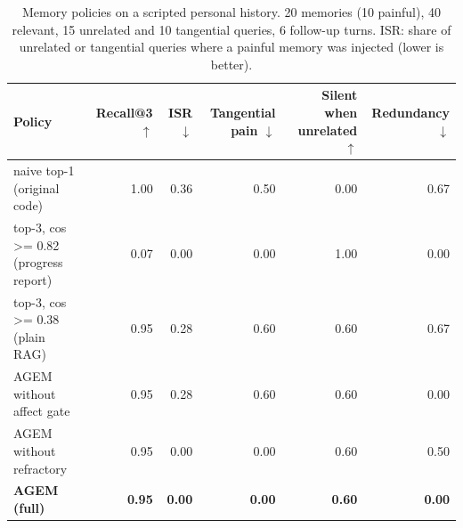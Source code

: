 \begin{table}[t]
\centering
\footnotesize
\caption{Memory policies on a scripted personal history. 20 memories (10 painful), 40 relevant, 15 unrelated and 10 tangential queries, 6 follow-up turns. ISR: share of unrelated or tangential queries where a painful memory was injected (lower is better).}
\label{tab:agem}
\setlength{\tabcolsep}{4pt}
\begin{tabular}{lrrrrr}
\toprule
\textbf{Policy} & \textbf{Recall@3 $\uparrow$} & \textbf{ISR $\downarrow$} & \textbf{Tangential pain $\downarrow$} & \textbf{Silent when unrelated $\uparrow$} & \textbf{Redundancy $\downarrow$} \\
\midrule
naive top-1 (original code) & 1.00 & 0.36 & 0.50 & 0.00 & 0.67 \\
top-3, cos >= 0.82 (progress report) & 0.07 & 0.00 & 0.00 & 1.00 & 0.00 \\
top-3, cos >= 0.38 (plain RAG) & 0.95 & 0.28 & 0.60 & 0.60 & 0.67 \\
AGEM without affect gate & 0.95 & 0.28 & 0.60 & 0.60 & 0.00 \\
AGEM without refractory & 0.95 & 0.00 & 0.00 & 0.60 & 0.50 \\
\textbf{AGEM (full)} & \textbf{0.95} & \textbf{0.00} & \textbf{0.00} & \textbf{0.60} & \textbf{0.00} \\
\bottomrule
\end{tabular}
\end{table}
